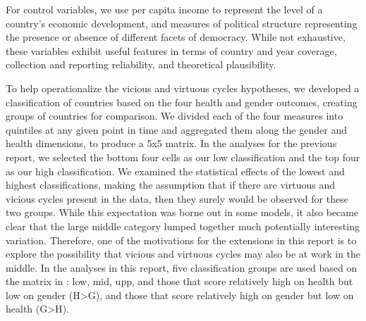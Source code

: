 \documentclass[12pt]{article}
\begin{document}
For control variables, we use per capita income to represent the level of a country's economic development, and measures of political structure representing the presence or absence of different facets of democracy. While not exhaustive, these variables exhibit useful features in terms of country and year coverage, collection and reporting reliability, and theoretical plausibility.



To help operationalize the vicious and virtuous cycles hypotheses, we developed a classification of countries based on the four health and gender outcomes, creating groups of countries for comparison.
We divided each of the four measures into quintiles at any given point in time and aggregated them along the gender and health dimensions, to produce a 5x5 matrix.
In the analyses for the previous report, we selected the bottom four cells as our low classification and the top four as our high classification. We examined the statistical effects of the lowest and highest classifications, making the assumption that if there are virtuous and vicious cycles present in the data, then they surely would be observed for these two groups. While this expectation was borne out in some models, it also became clear that the large middle category lumped together much potentially interesting variation. Therefore, one of the motivations for the extensions in this report is to explore the possibility that vicious and virtuous cycles may also be at work in the middle. In the analyses in this report, five classification groups are used based on the matrix in : low, mid, upp, and those that score relatively high on health but low on gender ({H>G}), and those that score relatively high on gender but low on health ({G>H}).
\end{document}
